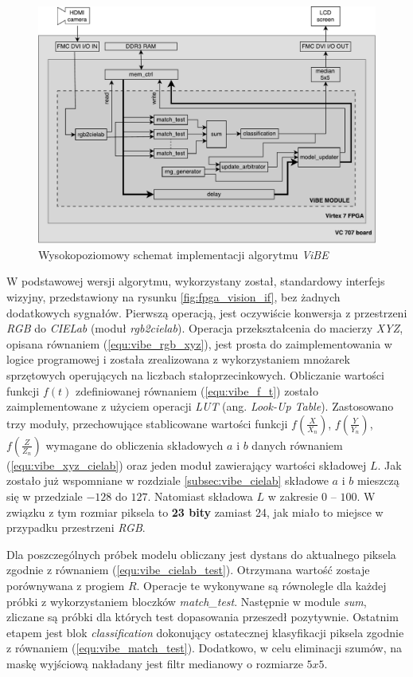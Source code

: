 	\begin{figure}[h!]
		\centering
		\includegraphics[scale=0.6]{img/4/vibe.pdf}
		\caption{Wysokopoziomowy schemat implementacji algorytmu \textit{ViBE}}
		\label{fig:vibe_diagram}
	\end{figure}

W podstawowej wersji algorytmu, wykorzystany został, standardowy interfejs wizyjny, przedstawiony na rysunku \ref{fig:fpga_vision_if}, bez żadnych dodatkowych sygnałów. Pierwszą operacją, jest oczywiście konwersja z przestrzeni \textit{RGB} do \textit{CIELab} (moduł \textit{rgb2cielab}). Operacja przekształcenia do macierzy \textit{XYZ}, opisana równaniem (\ref{equ:vibe_rgb_xyz}), jest prosta do zaimplementowania w logice programowej i została zrealizowana z wykorzystaniem mnożarek sprzętowych operujących na liczbach stałoprzecinkowych. Obliczanie wartości funkcji $f(t)$ zdefiniowanej równaniem (\ref{equ:vibe_f_t}) zostało zaimplementowane z użyciem operacji \textit{LUT} (ang. \textit{Look-Up Table}). Zastosowano trzy moduły, przechowujące stablicowane wartości funkcji $f(\frac{X}{X_n})$, $f(\frac{Y}{Y_n})$, $f(\frac{Z}{Z_n})$ wymagane do obliczenia składowych $a$ i $b$ danych równaniem (\ref{equ:vibe_xyz_cielab}) oraz jeden moduł zawierający wartości składowej $L$. Jak zostało już wspomniane w rozdziale \ref{subsec:vibe_cielab} składowe $a$ i $b$ mieszczą się w przedziale $-128$ do $127$. Natomiast składowa $L$ w zakresie $0$ -- $100$. W związku z tym rozmiar piksela to \textbf{23 bity} zamiast 24, jak miało to miejsce w przypadku przestrzeni \textit{RGB}.

Dla poszczególnych próbek modelu obliczany jest dystans do aktualnego piksela zgodnie z równaniem (\ref{equ:vibe_cielab_test}). Otrzymana wartość zostaje porównywana z progiem $R$. Operacje te wykonywane są równolegle dla każdej próbki z wykorzystaniem bloczków \textit{match\_test}. Następnie w module \textit{sum}, zliczane są próbki dla których test dopasowania przeszedł pozytywnie. Ostatnim etapem jest blok \textit{classification} dokonujący ostatecznej klasyfikacji piksela zgodnie z równaniem (\ref{equ:vibe_match_test}). Dodatkowo, w celu eliminacji szumów, na maskę wyjściową nakładany jest filtr medianowy o rozmiarze $5x5$.

